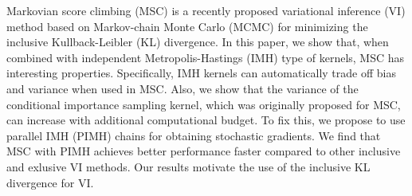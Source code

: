 
Markovian score climbing (MSC) is a recently proposed variational inference (VI) method based on Markov-chain Monte Carlo (MCMC) for minimizing the inclusive Kullback-Leibler (KL) divergence.
In this paper, we show that, when combined with independent Metropolis-Hastings (IMH) type of kernels, MSC has interesting properties.
Specifically, IMH kernels can automatically trade off bias and variance when used in MSC.
Also, we show that the variance of the conditional importance sampling kernel, which was originally proposed for MSC, can increase with additional computational budget.
To fix this, we propose to use parallel IMH (PIMH) chains for obtaining stochastic gradients.
We find that MSC with PIMH achieves better performance faster compared to other inclusive and exlusive VI methods.
Our results motivate the use of the inclusive KL divergence for VI.

